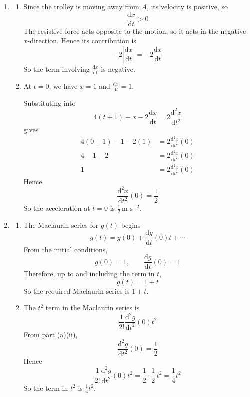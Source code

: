 \documentclass[leqno]{article}
\begin{document}
\begin{enumerate}[
  label=\textbf{\arabic*.},
  leftmargin=*,
  topsep=0pt,
  partopsep=0pt,
  parsep=0pt
]
\begin{tcolorbox}[colback=white, colframe=scarlet, title={\textbf{Solution}}, breakable, grow to left by=6mm, grow to right by=10mm]
\begin{enumerate}[label=\textbf{(\alph*)}]
  \item
  \begin{enumerate}[label=(\roman*)]
    \item Since the trolley is moving away from $A$, its velocity is positive, so
    \[
    \frac{\mathrm{d}x}{\mathrm{d}t}>0
    \]
    The resistive force acts opposite to the motion, so it acts in the negative $x$-direction. Hence its contribution is
    \[
    -2\left|\frac{\mathrm{d}x}{\mathrm{d}t}\right|=-2\frac{\mathrm{d}x}{\mathrm{d}t}
    \]
    So the term involving $\frac{\mathrm{d}x}{\mathrm{d}t}$ is negative.

    \item At $t=0$, we have $x=1$ and $\frac{\mathrm{d}x}{\mathrm{d}t}=1$.

    Substituting into
    \[
    4(t+1)-x-2\frac{\mathrm{d}x}{\mathrm{d}t}=2\frac{\mathrm{d}^2x}{\mathrm{d}t^2}
    \]
    gives
    \begin{align*}
    4(0+1)-1-2(1)&=2\frac{\mathrm{d}^2x}{\mathrm{d}t^2}(0)\\
    4-1-2&=2\frac{\mathrm{d}^2x}{\mathrm{d}t^2}(0)\\
    1&=2\frac{\mathrm{d}^2x}{\mathrm{d}t^2}(0)
    \end{align*}
    Hence
    \[
    \frac{\mathrm{d}^2x}{\mathrm{d}t^2}(0)=\frac12
    \]
    So the acceleration at $t=0$ is $\frac12\,\text{m s}^{-2}$.
  \end{enumerate}

  \item
  \begin{enumerate}[label=(\roman*)]
    \item The Maclaurin series for $g(t)$ begins
    \[
    g(t)=g(0)+\frac{\mathrm{d}g}{\mathrm{d}t}(0)t+\cdots
    \]
    From the initial conditions,
    \[
    g(0)=1,\qquad \frac{\mathrm{d}g}{\mathrm{d}t}(0)=1
    \]
    Therefore, up to and including the term in $t$,
    \[
    g(t)=1+t
    \]
    So the required Maclaurin series is $1+t$.

    \item The $t^2$ term in the Maclaurin series is
    \[
    \frac{1}{2!}\frac{\mathrm{d}^2g}{\mathrm{d}t^2}(0)t^2
    \]
    From part (a)(ii),
    \[
    \frac{\mathrm{d}^2g}{\mathrm{d}t^2}(0)=\frac12
    \]
    Hence
    \[
    \frac{1}{2!}\frac{\mathrm{d}^2g}{\mathrm{d}t^2}(0)t^2
    =\frac{1}{2}\cdot\frac12\,t^2
    =\frac14 t^2
    \]
    So the term in $t^2$ is $\frac14 t^2$.


\end{enumerate}
\end{enumerate}
\end{tcolorbox}
\end{enumerate}
\end{document}
